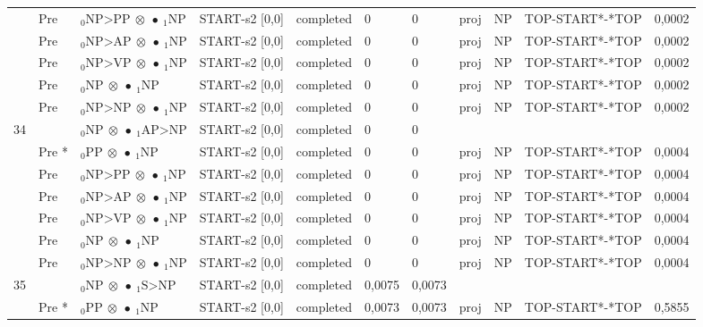 \documentclass[10pt]{article}
\begin{document}
\begin{longtable}[htbp]{lllllllllll}
 & Pre & $ {}_0 \textrm{NP>PP} \  \otimes \  \bullet \ {}_{1} \textrm{NP} $ & START-s2 [0,0] & completed & 0 & 0 & proj & NP & TOP-START*-*TOP & 0,0002 \\ 
 & Pre & $ {}_0 \textrm{NP>AP} \  \otimes \  \bullet \ {}_{1} \textrm{NP} $ & START-s2 [0,0] & completed & 0 & 0 & proj & NP & TOP-START*-*TOP & 0,0002 \\ 
 & Pre & $ {}_0 \textrm{NP>VP} \  \otimes \  \bullet \ {}_{1} \textrm{NP} $ & START-s2 [0,0] & completed & 0 & 0 & proj & NP & TOP-START*-*TOP & 0,0002 \\ 
 & Pre & $ {}_0 \textrm{NP} \  \otimes \  \bullet \ {}_{1} \textrm{NP} $ & START-s2 [0,0] & completed & 0 & 0 & proj & NP & TOP-START*-*TOP & 0,0002 \\ 
 & Pre & $ {}_0 \textrm{NP>NP} \  \otimes \  \bullet \ {}_{1} \textrm{NP} $ & START-s2 [0,0] & completed & 0 & 0 & proj & NP & TOP-START*-*TOP & 0,0002 \\ 
34 & & $ {}_0 \textrm{NP} \  \otimes \  \bullet \ {}_{1} \textrm{AP>NP} $ & START-s2 [0,0] & completed & 0 & 0 & & & & \\ 
 & Pre *& $ {}_0 \textrm{PP} \  \otimes \  \bullet \ {}_{1} \textrm{NP} $ & START-s2 [0,0] & completed & 0 & 0 & proj & NP & TOP-START*-*TOP & 0,0004 \\ 
 & Pre & $ {}_0 \textrm{NP>PP} \  \otimes \  \bullet \ {}_{1} \textrm{NP} $ & START-s2 [0,0] & completed & 0 & 0 & proj & NP & TOP-START*-*TOP & 0,0004 \\ 
 & Pre & $ {}_0 \textrm{NP>AP} \  \otimes \  \bullet \ {}_{1} \textrm{NP} $ & START-s2 [0,0] & completed & 0 & 0 & proj & NP & TOP-START*-*TOP & 0,0004 \\ 
 & Pre & $ {}_0 \textrm{NP>VP} \  \otimes \  \bullet \ {}_{1} \textrm{NP} $ & START-s2 [0,0] & completed & 0 & 0 & proj & NP & TOP-START*-*TOP & 0,0004 \\ 
 & Pre & $ {}_0 \textrm{NP} \  \otimes \  \bullet \ {}_{1} \textrm{NP} $ & START-s2 [0,0] & completed & 0 & 0 & proj & NP & TOP-START*-*TOP & 0,0004 \\ 
 & Pre & $ {}_0 \textrm{NP>NP} \  \otimes \  \bullet \ {}_{1} \textrm{NP} $ & START-s2 [0,0] & completed & 0 & 0 & proj & NP & TOP-START*-*TOP & 0,0004 \\ 
35 & & $ {}_0 \textrm{NP} \  \otimes \  \bullet \ {}_{1} \textrm{S>NP} $ & START-s2 [0,0] & completed & 0,0075 & 0,0073 & & & & \\ 
 & Pre *& $ {}_0 \textrm{PP} \  \otimes \  \bullet \ {}_{1} \textrm{NP} $ & START-s2 [0,0] & completed & 0,0073 & 0,0073 & proj & NP & TOP-START*-*TOP & 0,5855 \\ 

\end{longtable}
\end{document}
